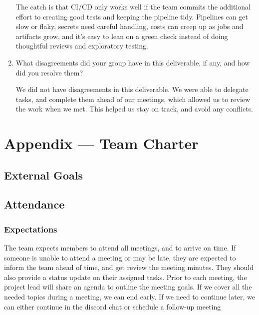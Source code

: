 \documentclass{article}
\begin{document}
\begin{enumerate}
The catch is that CI/CD only works well if the team commits the additional effort to creating good tests and keeping the pipeline tidy. Pipelines can get slow or flaky, secrets need careful handling, costs can creep up as jobs and artifacts grow, and it’s easy to lean on a green check instead of doing thoughtful reviews and exploratory testing.

    \item What disagreements did your group have in this deliverable, if any,
    and how did you resolve them?

    We did not have disagreements in this deliverable. We were able to delegate tasks, and complete them ahead of our meetings, which allowed us to review the work when we met. This helped us stay on track, and avoid any conflicts. 
\end{enumerate}

\newpage{}

\section*{Appendix --- Team Charter}



\subsection*{External Goals}

\begin{comment}
\wss{What are your team's external goals for this project? These are not the
goals related to the functionality or quality fo the project.  These are the
goals on what the team wishes to achieve with the project.  Potential goals are
to win a prize at the Capstone EXPO, or to have something to talk about in
interviews, or to get an A+, etc.}
\end{comment}

\subsection*{Attendance}

\subsubsection*{Expectations}

\begin{comment}
\wss{What are your team's expectations regarding meeting attendance (being on
time, leaving early, missing meetings, etc.)?}
\end{comment}
The team expects members to attend all meetings, and to arrive on time. If someone is unable to attend a meeting or may be late, they are expected to inform the team ahead of time, and get review the meeting minutes. They should also provide a status update on their assigned tasks. Prior to each meeting, the project lead will share an agenda to outline the meeting goals. If we cover all the needed topics during a meeting, we can end early. If we need to continue later, we can either continue in the discord chat or schedule a follow-up meeting
\end{document}
